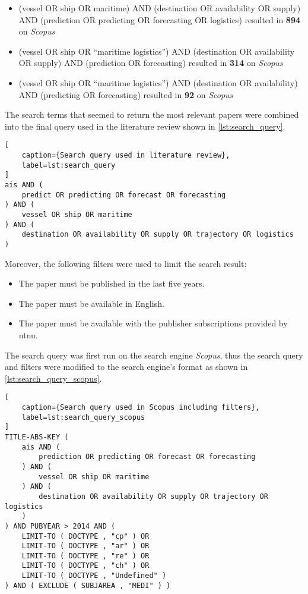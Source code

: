 \begin{itemize}
    \item (vessel OR ship OR maritime) AND (destination OR availability OR supply) AND (prediction OR predicting OR forecasting OR logistics) resulted in \textbf{894} on \textit{Scopus}
    \item (vessel OR ship OR ``maritime logistics'') AND (destination OR availability OR supply) AND (prediction OR forecasting) resulted in \textbf{314} on \textit{Scopus}
    \item (vessel OR ship OR ``maritime logistics'') AND (destination OR availability) AND (predicting OR forecasting) resulted in \textbf{92} on \textit{Scopus}
\end{itemize}

The search terms that seemed to return the most relevant papers were combined into the final query used in the literature review shown in \cref{lst:search_query}.

\begin{lstlisting}[
    caption={Search query used in literature review},
    label=lst:search_query
]
ais AND (
    predict OR predicting OR forecast OR forecasting
) AND (
    vessel OR ship OR maritime
) AND (
    destination OR availability OR supply OR trajectory OR logistics
)
\end{lstlisting}

Moreover, the following filters were used to limit the search result:

\begin{itemize}
    \item The paper must be published in the last five years.
    \item The paper must be available in English.
    \item The paper must be available with the publisher subscriptions provided by \acrshort{ntnu}.
\end{itemize}

The search query was first run on the search engine \textit{Scopus}, thus the search query and filters were modified to the search engine's format as shown in \cref{lst:search_query_scopus}.

\begin{lstlisting}[
    caption={Search query used in Scopus including filters},
    label=lst:search_query_scopus
]
TITLE-ABS-KEY (
    ais AND (
        prediction OR predicting OR forecast OR forecasting
    ) AND (
        vessel OR ship OR maritime
    ) AND (
        destination OR availability OR supply OR trajectory OR logistics
    )
) AND PUBYEAR > 2014 AND (
    LIMIT-TO ( DOCTYPE , "cp" ) OR
    LIMIT-TO ( DOCTYPE , "ar" ) OR
    LIMIT-TO ( DOCTYPE , "re" ) OR
    LIMIT-TO ( DOCTYPE , "ch" ) OR
    LIMIT-TO ( DOCTYPE , "Undefined" )
) AND ( EXCLUDE ( SUBJAREA , "MEDI" ) )
\end{lstlisting}

